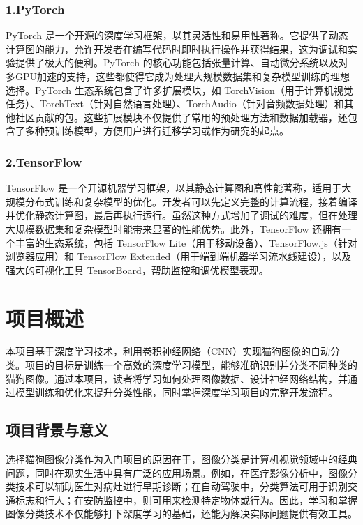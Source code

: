 \subsubsection{1.PyTorch}
PyTorch 是一个开源的深度学习框架，以其灵活性和易用性著称。它提供了动态计算图的能力，允许开发者在编写代码时即时执行操作并获得结果，这为调试和实验提供了极大的便利。PyTorch 的核心功能包括张量计算、自动微分系统以及对多GPU加速的支持，这些都使得它成为处理大规模数据集和复杂模型训练的理想选择。PyTorch 生态系统包含了许多扩展模块，如 TorchVision（用于计算机视觉任务）、TorchText（针对自然语言处理）、TorchAudio（针对音频数据处理）和其他社区贡献的包。这些扩展模块不仅提供了常用的预处理方法和数据加载器，还包含了多种预训练模型，方便用户进行迁移学习或作为研究的起点。

\subsubsection{2.TensorFlow}
TensorFlow 是一个开源机器学习框架，以其静态计算图和高性能著称，适用于大规模分布式训练和复杂模型的优化。开发者可以先定义完整的计算流程，接着编译并优化静态计算图，最后再执行运行。虽然这种方式增加了调试的难度，但在处理大规模数据集和复杂模型时能带来显著的性能优势。此外，TensorFlow 还拥有一个丰富的生态系统，包括 TensorFlow Lite（用于移动设备）、TensorFlow.js（针对浏览器应用）和 TensorFlow Extended（用于端到端机器学习流水线建设），以及强大的可视化工具 TensorBoard，帮助监控和调优模型表现。

\section{项目概述}

本项目基于深度学习技术，利用卷积神经网络（CNN）实现猫狗图像的自动分类。项目的目标是训练一个高效的深度学习模型，能够准确识别并分类不同种类的猫狗图像。通过本项目，读者将学习如何处理图像数据、设计神经网络结构，并通过模型训练和优化来提升分类性能，同时掌握深度学习项目的完整开发流程。

\subsection{项目背景与意义}

选择猫狗图像分类作为入门项目的原因在于，图像分类是计算机视觉领域中的经典问题，同时在现实生活中具有广泛的应用场景。例如，在医疗影像分析中，图像分类技术可以辅助医生对病灶进行早期诊断；在自动驾驶中，分类算法可用于识别交通标志和行人；在安防监控中，则可用来检测特定物体或行为。因此，学习和掌握图像分类技术不仅能够打下深度学习的基础，还能为解决实际问题提供有效工具。

